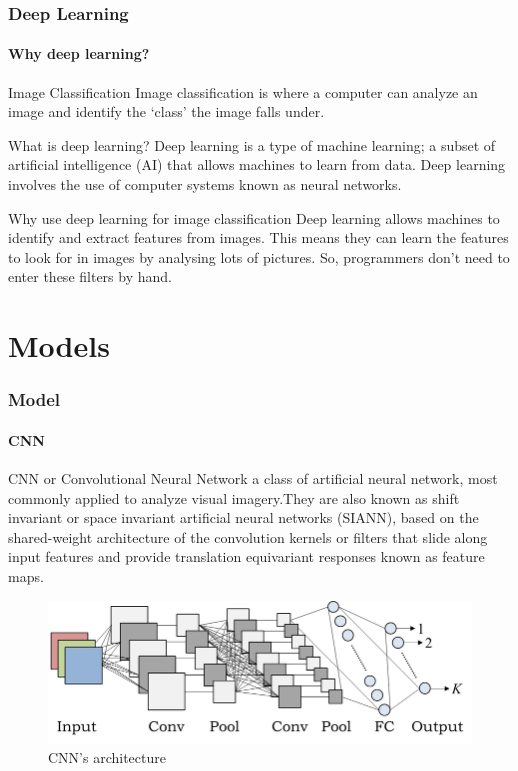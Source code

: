 \documentclass[10pt, aspectratio=169]{beamer}
\begin{document}
	\begin{frame}
		\frametitle{Deep Learning}
		\framesubtitle{Why deep learning?}

		\begin{block}{Image Classification}
			Image classification is where a computer can analyze an image and
			identify the ‘class’ the image falls under.
		\end{block}

		\begin{block}{What is deep learning?}
			Deep learning is a type of machine learning; a subset of artificial
			intelligence (AI) that allows machines to learn from data. Deep
			learning involves the use of computer systems known as neural
			networks.
		\end{block}

		\begin{block}{Why use deep learning for image classification}
			Deep learning allows machines to identify and extract features from
			images. This means they can learn the features to look for in images
			by analysing lots of pictures. So, programmers don’t need to enter
			these filters by hand.
		\end{block}

	\end{frame}

	\section{Models}

	\begin{frame}
		\frametitle{Model}
		\framesubtitle{CNN}


		CNN or Convolutional Neural Network a class of artificial neural
		network, most commonly applied to analyze visual imagery.They are also
		known as shift invariant or space invariant artificial neural networks
		(SIANN), based on the shared-weight architecture of the convolution
		kernels or filters that slide along input features and provide
		translation equivariant responses known as feature maps.

	\end{frame}

	\begin{frame}
		\begin{figure}[h]
			\centering
			\includegraphics[width=\linewidth]{imgs/cnn_arch.png}
			\caption{CNN's architecture}%
			\label{fig:imgs/cnn_arch}
		\end{figure}
	\end{frame}
\end{document}
